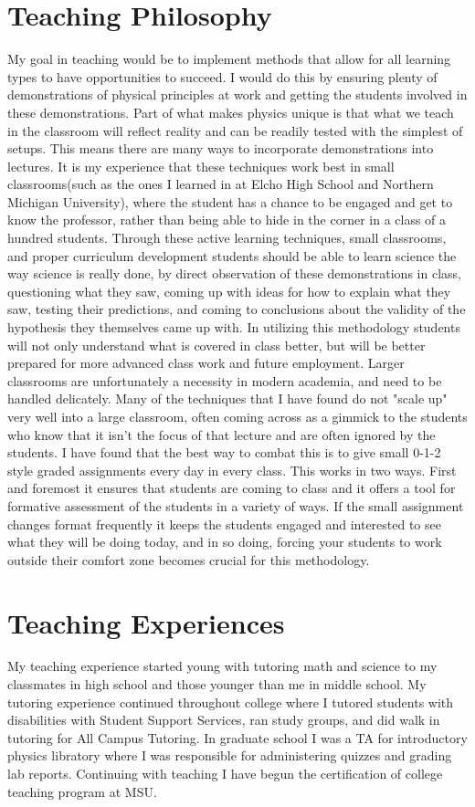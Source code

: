 \documentclass{article}
\begin{document}
\section{Teaching Philosophy}
My goal in teaching would be to implement methods that allow for all learning types to have opportunities to succeed. I would do this by ensuring plenty of demonstrations of physical principles at work and getting the students involved in these demonstrations. Part of what makes physics unique is that what we teach in the classroom will reflect reality and can be readily tested with the simplest of setups. This means there are many ways to incorporate demonstrations into lectures. It is my experience that these techniques work best in small classrooms(such as the ones I learned in at Elcho High School and Northern Michigan University), where the student has a chance to be engaged and get to know the professor, rather than being able to hide in the corner in a class of a hundred students. Through these active learning techniques, small classrooms, and proper curriculum development students should be able to learn science the way science is really done, by direct observation of these demonstrations in class, questioning what they saw, coming up with ideas for how to explain what they saw, testing their predictions, and coming to conclusions about the validity of the hypothesis they themselves came up with. In utilizing this methodology students will not only understand what is covered in class better, but will be better prepared for more advanced class work and future employment. 
Larger classrooms are unfortunately a necessity in modern academia, and need to be handled delicately. Many of the techniques that I have found do not "scale up" very well into a large classroom, often coming across as a gimmick to the students who know that it isn't the focus of that lecture and are often ignored by the students. I have found that the best way to combat this is to give small 0-1-2 style graded assignments every day in every class. This works in two ways. First and foremost it ensures that students are coming to class and it offers a tool for formative assessment of the students in a variety of ways. If the small assignment changes format frequently it keeps the students engaged and interested to see what they will be doing today, and in so doing, forcing your students to work outside their comfort zone becomes crucial for this methodology. 
\newpage


\section{Teaching Experiences}
My teaching experience started young with tutoring math and science to my classmates in high school and those younger than me in middle school. My tutoring experience continued throughout college where I tutored students with disabilities with Student Support Services, ran study groups, and did walk in tutoring for All Campus Tutoring. In graduate school I was a TA for introductory physics libratory where I was responsible for administering quizzes and grading lab reports. Continuing with teaching I have begun the certification of college teaching program at MSU.
\end{document}

